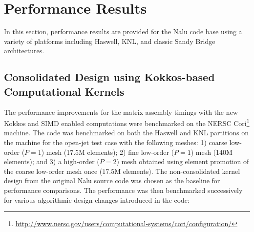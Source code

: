 \section{Performance Results}
\label{s:results}
In this section, performance results are provided for the Nalu code base
using a variety of platforms including Haswell, KNL, and classic Sandy Bridge
architectures.

\subsection{Consolidated Design using Kokkos-based Computational Kernels}

The performance improvements for the matrix assembly timings with the new Kokkos
and SIMD enabled computations were benchmarked on the NERSC
Cori\footnote{\url{http://www.nersc.gov/users/computational-systems/cori/configuration/}}
machine. The code was benchmarked on both the Haswell and KNL partitions on the
machine for the open-jet test case with the following meshes: 1) coarse
low-order ($P=1$) mesh (17.5M  elements); 2) fine low-order
($P=1$) mesh (140M  elements); and 3) a high-order ($P=2$)
mesh obtained using element promotion of the coarse low-order mesh once ($17.5$M
 elements). The non-consolidated kernel design from the
original Nalu source code was chosen as the baseline for performance
comparisons. The performance was then benchmarked successively for various
algorithmic design changes introduced in the code:

